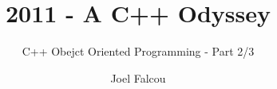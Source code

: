 \documentclass{beamer}
\title{2011 - A C++ Odyssey}
\subtitle{C++ Obejct Oriented Programming - Part 2/3}
\author{Joel Falcou}
\institute{Laboratoire de Recherche en Informatique - Université Paris Sud 11}
\date{}
\begin{document}
\begin{frame}[plain]
\titlepage
\end{frame}

%

%

%

%

%
\end{document}
